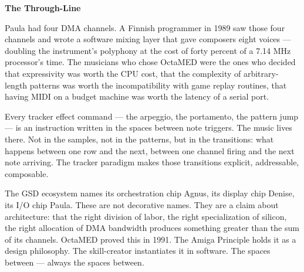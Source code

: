 \documentclass[11pt,letterpaper]{article}
\begin{document}
\begin{quotebox}
\textbf{\sffamily\textcolor{primary}{The Through-Line}}

\medskip
Paula had four DMA channels. A Finnish programmer in 1989 saw those four channels and wrote a software mixing layer that gave composers eight voices --- doubling the instrument's polyphony at the cost of forty percent of a 7.14 MHz processor's time. The musicians who chose OctaMED were the ones who decided that expressivity was worth the CPU cost, that the complexity of arbitrary-length patterns was worth the incompatibility with game replay routines, that having MIDI on a budget machine was worth the latency of a serial port.

\medskip
Every tracker effect command --- the arpeggio, the portamento, the pattern jump --- is an instruction written in the spaces between note triggers. The music lives there. Not in the samples, not in the patterns, but in the transitions: what happens between one row and the next, between one channel firing and the next note arriving. The tracker paradigm makes those transitions explicit, addressable, composable.

\medskip
The GSD ecosystem names its orchestration chip Agnus, its display chip Denise, its I/O chip Paula. These are not decorative names. They are a claim about architecture: that the right division of labor, the right specialization of silicon, the right allocation of DMA bandwidth produces something greater than the sum of its channels. OctaMED proved this in 1991. The Amiga Principle holds it as a design philosophy. The skill-creator instantiates it in software. The spaces between --- always the spaces between.
\end{quotebox}
\end{document}
